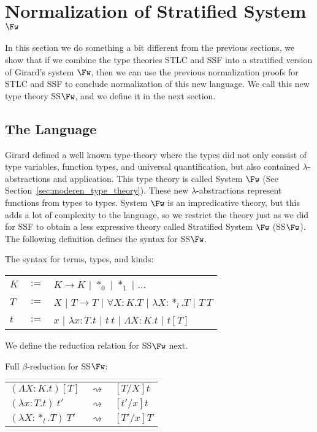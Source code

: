 \section{Normalization of Stratified System $\Fw$}
\label{subsec:normalization_stratified_system_fw}
In this section we do something a bit different from the previous
sections, we show that if we combine the type theories STLC and SSF
into a stratified version of Girard's system $\Fw$, then we can use
the previous normalization proofs for STLC and SSF to conclude
normalization of this new language.  We call this new type theory
SS$\Fw$, and we define it in the next section.

\subsection{The Language}
\label{subsec:the_language}
Girard defined a well known type-theory where the types did not only
consist of type variables, function types, and universal
quantification, but also contained $\lambda$-abstractions and
application.  This type theory is called System $\Fw$
\cite{barendregt92} (See Section~\ref{sec:moderen_type_theory}). These
new $\lambda$-abstractions represent functions from types to types.
System $\Fw$ is an impredicative theory, but this adds a lot of
complexity to the language, so we restrict the theory just as we did
for SSF to obtain a less expressive theory called Stratified System
$\Fw$ (SS$\Fw$). The following definition defines the syntax for
SS$\Fw$.
\begin{definition}
  \label{def:syntax_ssfw}
  The syntax for terms, types, and kinds:
  \begin{center}
    \begin{tabular}{lll}
      $K$ & $:=$ & $K \to K$ $|$ $*_0$ $|$ $*_1$ $|$ $\ldots$\\
      $T$ & $:=$ & $X$   $|$ $T \rightarrow T$ $|$ $\forall X:K.T$ $|$ $\lambda X:*_l.T$ $|$ $T\ T$\\
      $t$ & $:=$ & $x$   $|$ $\lambda x:T.t$   $|$ $t\ t$ $|$ $\Lambda X:K.t$ $|$ $t[T]$\\
    \end{tabular}
  \end{center}
\end{definition}
\noindent We define the reduction relation for SS$\Fw$ next.
\begin{definition}
  \label{def:reduction_rules_ssf}
  Full $\beta$-reduction for SS$\Fw$:
  \begin{center}
    \begin{tabular}{lll}
      $(\Lambda X:K.t)[T]$     & $\rightsquigarrow$ & $[T/X]t$\\
      $(\lambda x:T.t)\ t'$      & $\rightsquigarrow$ & $[t'/x]t$\\
      $(\lambda X:*_l.T)\ T'$ & $\rightsquigarrow$ & $[T'/x]T$
    \end{tabular}
  \end{center}
\end{definition}

